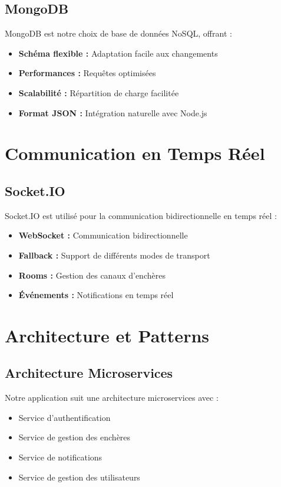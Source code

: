 \subsection{MongoDB}
MongoDB \cite{mongodb} est notre choix de base de données NoSQL, offrant :

\begin{itemize}
    \item \textbf{Schéma flexible :} Adaptation facile aux changements
    \item \textbf{Performances :} Requêtes optimisées
    \item \textbf{Scalabilité :} Répartition de charge facilitée
    \item \textbf{Format JSON :} Intégration naturelle avec Node.js
\end{itemize}

\section{Communication en Temps Réel}
\subsection{Socket.IO}
Socket.IO \cite{socketio} est utilisé pour la communication bidirectionnelle en temps réel :

\begin{itemize}
    \item \textbf{WebSocket :} Communication bidirectionnelle
    \item \textbf{Fallback :} Support de différents modes de transport
    \item \textbf{Rooms :} Gestion des canaux d'enchères
    \item \textbf{Événements :} Notifications en temps réel
\end{itemize}

\section{Architecture et Patterns}
\subsection{Architecture Microservices}
Notre application suit une architecture microservices avec :

\begin{itemize}
    \item Service d'authentification
    \item Service de gestion des enchères
    \item Service de notifications
    \item Service de gestion des utilisateurs
\end{itemize}

